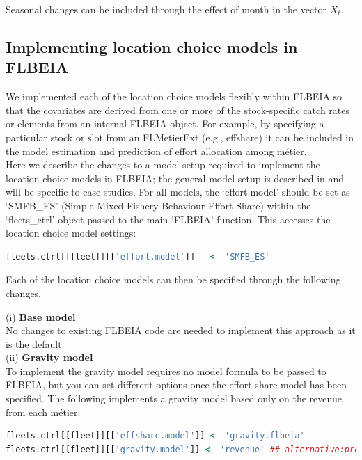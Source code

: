 \documentclass[12pt, halfline, a4paper]{ouparticle}
\begin{document}
Seasonal changes can be included through the effect of month in the vector
$X_t$. 

\subsection{Implementing location choice models in FLBEIA}
\label{sec:imp}

We implemented each of the location choice models flexibly within FLBEIA so that the
covariates are derived from one or more of the stock-specific catch rates or
elements from an internal FLBEIA object. For example, by specifying a
particular stock or slot from an FLMetierExt (e.g., effshare) it can be included
in the model estimation and prediction of effort allocation among métier. \\

Here we describe the changes to a model setup required to implement the
location choice models in FLBEIA; the general model setup is described in
\cite{Garcia2017a} and will be specific to case studies. For all models, the
`effort.model' should be set as `SMFB\_ES' (Simple Mixed Fishery Behaviour
Effort Share) within the `fleets\_ctrl' object passed to the main `FLBEIA'
function. This accesses the location choice model settings:

\begin{lstlisting}[language=R]
fleets.ctrl[[fleet]][['effort.model']]   <- 'SMFB_ES'
\end{lstlisting} 

Each of the location choice models can then be specified through the following
changes. 

(i) \textbf{Base model} \\

No changes to existing FLBEIA code are needed to implement this approach as it is the default. \\

(ii) \textbf{Gravity model} \\

To implement the gravity model requires no model formula to be passed to
FLBEIA, but you can set different options once the effort share model has been
specified. The following implements a gravity model based only on the revenue
from each métier:

\begin{lstlisting}[language=R]
fleets.ctrl[[fleet]][['effshare.model']] <- 'gravity.flbeia'
fleets.ctrl[[fleet]][['gravity.model']] <- 'revenue' ## alternative:profit 
\end{lstlisting}
\end{document}

